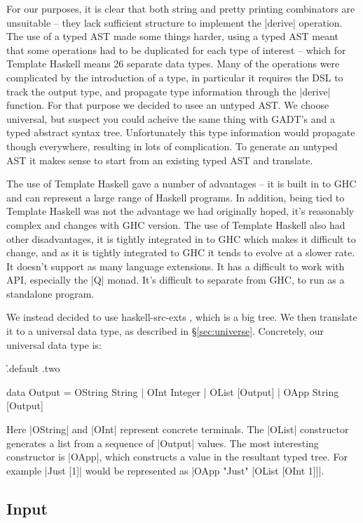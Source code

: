 \documentclass[preprint]{sigplanconf}
\begin{document}
For our purposes, it is clear that both string and pretty printing combinators are unsuitable -- they lack sufficient structure to implement the |derive| operation. The use of a typed AST made some things harder, using a typed AST meant that some operations had to be duplicated for each type of interest -- which for Template Haskell means 26 separate data types. Many of the operations were complicated by the introduction of a type, in particular it requires the DSL to track the output type, and propagate type information through the |derive| function. For that purpose we decided to usee an untyped AST. We choose universal, but suspect you could acheive the same thing with GADT's and a typed abstract syntax tree. Unfortunately this type information would propagate though everywhere, resulting in lots of complication. To generate an untyped AST it makes sense to start from an existing typed AST and translate.

The use of Template Haskell gave a number of advantages -- it is built in to GHC and can represent a large range of Haskell programs. In addition, being tied to Template Haskell was not the advantage we had originally hoped, it's reasonably complex and changes with GHC version. The use of Template Haskell also had other disadvantages, it is tightly integrated in to GHC which makes it difficult to change, and as it is tightly integrated to GHC it tends to evolve at a slower rate. It doesn't support as many language extensions. It has a difficult to work with API, especially the |Q| monad. It's difficult to separate from GHC, to run as a standalone program.

We instead decided to use haskell-src-exts \cite{haskell_src_exts}, which is a big tree. We then translate it to a universal data type, as described in \S\ref{sec:universe}. Concretely, our universal data type is:

\h{.default .two}\begin{code}
data Output  =  OString String
             |  OInt Integer
             |  OList [Output]
             |  OApp String [Output]
\end{code}

Here |OString| and |OInt| represent concrete terminals. The |OList| constructor generates a list from a sequence of  |Output| values. The most interesting constructor is |OApp|, which constructs a value in the resultant typed tree. For example |Just [1]| would be represented as |OApp "Just" [OList [OInt 1]]|.

\subsection{Input}
\end{document}
